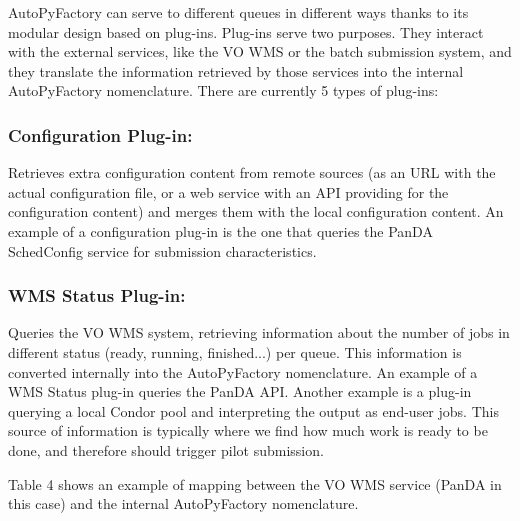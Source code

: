 \documentclass[a4paper]{jpconf}
\begin{document}
AutoPyFactory can serve to different queues in different ways 
thanks to its modular design based on plug-ins. 
Plug-ins serve two purposes. 
They interact with the external services, like the VO WMS or the batch submission system,
and they translate the information retrieved by those services into the internal AutoPyFactory nomenclature.
There are currently 5 types of plug-ins:


\subsubsection{Configuration Plug-in:}

Retrieves extra configuration content from remote sources 
(as an URL with the actual configuration file, or a web service with an API providing for the configuration content)
and merges them with the local configuration content.
An example of a configuration plug-in is the one that queries the PanDA
SchedConfig service for submission characteristics.


\subsubsection{WMS Status Plug-in:}
Queries the VO WMS system, 
retrieving information about the number of jobs in different status (ready, running, finished...) per queue.
This information is converted internally into the AutoPyFactory nomenclature.
An example of a WMS Status plug-in queries the PanDA API.
Another example is a plug-in querying a local Condor pool and interpreting the
output as end-user jobs. This source of information is typically where we find
how much work is ready to be done, and therefore should trigger pilot
submission. 


Table 4 shows an example of mapping between the VO WMS service 
(PanDA in this case)
and the internal AutoPyFactory nomenclature.
\end{document}
